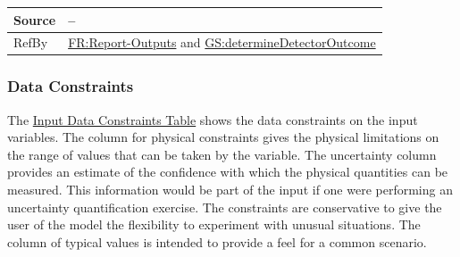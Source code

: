 \documentclass[12pt]{article}
\begin{document}
\begin{minipage}{\textwidth}
\begin{tabular}{>{\raggedright}p{}>{\raggedright\arraybackslash}p{}}
\\ \midrule
Source & --
         
\\ \midrule
RefBy & \hyperref[reportOutputs]{FR:Report-Outputs} and \hyperref[determineDetectorOutcome]{GS:determineDetectorOutcome}
        
\\ \bottomrule
\end{tabular}
\end{minipage}

\subsubsection{Data Constraints}
\label{Sec:DataConstraints}
The \hyperref[Table:InDataConstraints]{Input Data Constraints Table} shows the data constraints on the input variables. The column for physical constraints gives the physical limitations on the range of values that can be taken by the variable. The uncertainty column provides an estimate of the confidence with which the physical quantities can be measured. This information would be part of the input if one were performing an uncertainty quantification exercise. The constraints are conservative to give the user of the model the flexibility to experiment with unusual situations. The column of typical values is intended to provide a feel for a common scenario.
\end{document}
